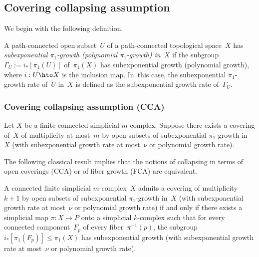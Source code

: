 \subsection{Covering collapsing assumption} \label{sec:zerovol}
We begin with the following definition.

\begin{definition} \label{def:subexp}
A path-connected open subset~$U$ of a path-connected topological space~$X$ has \emph{subexponential $\pi_1$-growth (\resp polynomial $\pi_1$-growth) in~$X$} if the subgroup $\Gamma_U:=i_*[\pi_1(U)]$ of~$\pi_1(X)$ has subexponential growth (\resp polynomial growth), where $i:U \hto X$ is the inclusion map. In~this case, the subexponential $\pi_1$-growth rate of~$U$ in~$X$ is defined as the subexponential growth rate of~$\Gamma_U$.
\end{definition}

\subsubsection*{Covering collapsing assumption (CCA)}
Let $X$ be a finite connected simplicial $m$\nobreakdash-complex.
Suppose there exists a covering of~$X$ of multiplicity at most~$m$ by open subsets of subexponential $\pi_1$-growth in~$X$ (with subexponential growth rate at most~$\nu$ or polynomial growth rate).

The following classical result implies that the notions of collapsing in terms of open coverings (CCA) or of fiber growth (FCA) are equivalent.

\begin{proposition} \label{prop:cover}
A connected finite simplicial $m$\nobreakdash-complex~$X$ admits a covering of multiplicity~$k+1$ by open subsets of subexponential $\pi_1$-growth in~$X$ (with subexponential growth rate at most~$\nu$ or polynomial growth rate) if and only if there exists a simplicial map $\pi:X \to P$ onto a simplicial $k$-complex such that for every connected component~$F_p$ of every fiber~$\pi^{-1}(p)$, the subgroup $i_*[\pi_1(F_p)] \leqslant \pi_1(X)$ has subexponential growth (with subexponential growth rate at most~$\nu$ or polynomial growth rate).
\end{proposition}

